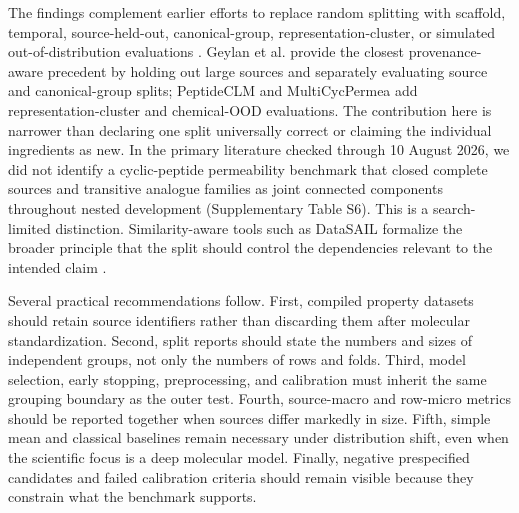 \documentclass[referee,lineno,pdflatex,Numbered,sn-basic]{sn-jnl}
\begin{document}
The findings complement earlier efforts to replace random splitting with scaffold, temporal, source-held-out, canonical-group, representation-cluster, or simulated out-of-distribution evaluations \cite{wu2018moleculenet,sheridan2013timesplit,landrum2023simpd,geyland2024applicability,feller2025peptideclm,liu2025benchmark,wang2025multicycpermea}. Geylan et al. provide the closest provenance-aware precedent by holding out large sources and separately evaluating source and canonical-group splits; PeptideCLM and MultiCycPermea add representation-cluster and chemical-OOD evaluations. The contribution here is narrower than declaring one split universally correct or claiming the individual ingredients as new. In the primary literature checked through 10 August 2026, we did not identify a cyclic-peptide permeability benchmark that closed complete sources and transitive analogue families as joint connected components throughout nested development (Supplementary Table S6). This is a search-limited distinction. Similarity-aware tools such as DataSAIL formalize the broader principle that the split should control the dependencies relevant to the intended claim \cite{kalinina2025datasail}.

Several practical recommendations follow. First, compiled property datasets should retain source identifiers rather than discarding them after molecular standardization. Second, split reports should state the numbers and sizes of independent groups, not only the numbers of rows and folds. Third, model selection, early stopping, preprocessing, and calibration must inherit the same grouping boundary as the outer test. Fourth, source-macro and row-micro metrics should be reported together when sources differ markedly in size. Fifth, simple mean and classical baselines remain necessary under distribution shift, even when the scientific focus is a deep molecular model. Finally, negative prespecified candidates and failed calibration criteria should remain visible because they constrain what the benchmark supports.
\end{document}
